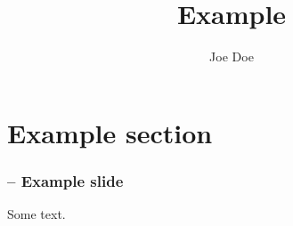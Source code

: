 \documentclass{beamer}
\title{Example}
\author{Joe Doe}
\begin{document}
\section{Example section}

    \begin{frame}
    \frametitle{\insertsectionhead{} -- Example slide}
    Some text.
  \end{frame}
\end{document}
